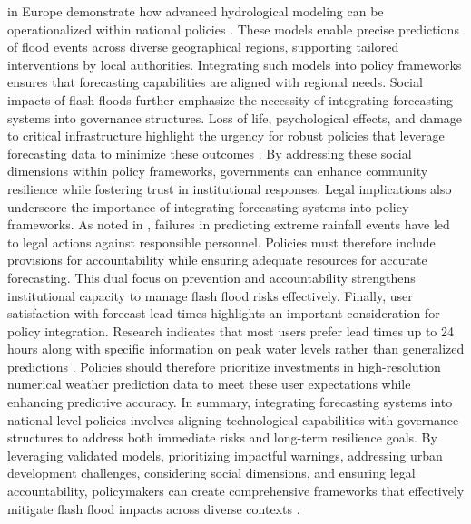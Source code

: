 in Europe demonstrate how advanced hydrological modeling can be operationalized within national policies \citep{Zanchetta2020}. These models enable precise predictions of flood events across diverse geographical regions, supporting tailored interventions by local authorities. Integrating such models into policy frameworks ensures that forecasting capabilities are aligned with regional needs. Social impacts of flash floods further emphasize the necessity of integrating forecasting systems into governance structures. Loss of life, psychological effects, and damage to critical infrastructure highlight the urgency for robust policies that leverage forecasting data to minimize these outcomes \citep{Beilicci2024}. By addressing these social dimensions within policy frameworks, governments can enhance community resilience while fostering trust in institutional responses. Legal implications also underscore the importance of integrating forecasting systems into policy frameworks. As noted in \citep{Silvestro2017}, failures in predicting extreme rainfall events have led to legal actions against responsible personnel. Policies must therefore include provisions for accountability while ensuring adequate resources for accurate forecasting. This dual focus on prevention and accountability strengthens institutional capacity to manage flash flood risks effectively. Finally, user satisfaction with forecast lead times highlights an important consideration for policy integration. Research indicates that most users prefer lead times up to 24 hours along with specific information on peak water levels rather than generalized predictions \citep{Philipp2016}. Policies should therefore prioritize investments in high-resolution numerical weather prediction data to meet these user expectations while enhancing predictive accuracy. In summary, integrating forecasting systems into national-level policies involves aligning technological capabilities with governance structures to address both immediate risks and long-term resilience goals. By leveraging validated models, prioritizing impactful warnings, addressing urban development challenges, considering social dimensions, and ensuring legal accountability, policymakers can create comprehensive frameworks that effectively mitigate flash flood impacts across diverse contexts \citep{Jubach2016}\citep{Henderson2020}\citep{Kastridis2020}\citep{Beilicci2024}.
